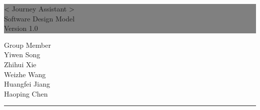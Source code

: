 \documentclass[10pt]{article}
\begin{document}

\begin{titlepage} %
	
	
	\colorbox{grey}{
		\parbox[t]{1.1\textwidth}{ %
			\parbox[t]{1.02\textwidth}{ %
				\raggedleft %
				\fontsize{34pt}{40pt}\selectfont %
				\vspace{0.7cm} %
				
				< Journey Assistant >\\
                Software Design Model\\
                Version 1.0\\
				
				\vspace{0.7cm} %
			}
		}
	}
	
	\vfill %
	
	
	\parbox[t]{1\textwidth}{ %
		\raggedleft %
		\large %
		{\Large Group Member}\\[4pt] %
        Yiwen Song\\
        Zhihui Xie\\
        Weizhe Wang\\
        Huangfei Jiang\\
        Haoping Chen\\
		
		\hfill\rule{0.2\linewidth}{1pt}%
    }
    
	
\end{titlepage}
\end{document}
